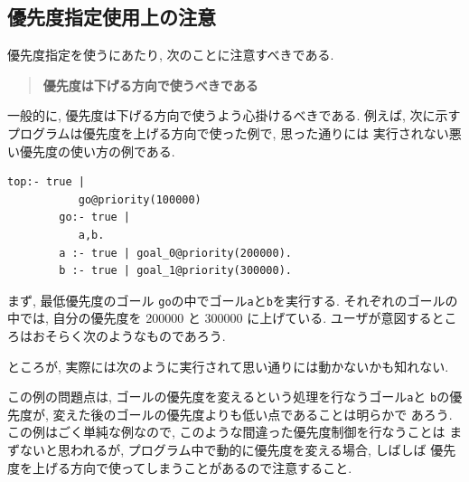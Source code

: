 \documentclass[a4,titlepage]{jsreport}
\let\dg\bf
\def\_{\leavevmode \kern.06em \vbox{\hrule width.3em}\penalty\exhyphenpenalty}
\begin{document}
\subsection{優先度指定使用上の注意}
優先度指定を使うにあたり, 次のことに注意すべきである.  

\begin{quote}
{\dg 優先度は下げる方向で使うべきである}
\end{quote}

一般的に, 優先度は下げる方向で使うよう心掛けるべきである. 例えば, 
次に示すプログラムは優先度を上げる方向で使った例で, 思った通りには
実行されない悪い優先度の使い方の例である. 


\begin{Verbatim}[baselinestretch=0.8]
        top:- true |
           go@priority(100000)
        go:- true |
           a,b.
        a :- true | goal_0@priority(200000).
        b :- true | goal_1@priority(300000).
\end{Verbatim}

まず, 最低優先度のゴール
{\tt go}の中でゴール{\tt a}と{\tt b}を実行する. それぞれのゴールの
中では, 自分の優先度を 200000 と 300000 に上げている. 
ユーザが意図するところはおそらく次のようなものであろう.


ところが, 実際には次のように実行されて思い通りには動かないかも知れない.


この例の問題点は, ゴールの優先度を変えるという処理を行なうゴール{\tt a}と
{\tt b}の優先度が, 変えた後のゴールの優先度よりも低い点であることは明らかで
あろう. この例はごく単純な例なので, このような間違った優先度制御を行なうことは
まずないと思われるが, プログラム中で動的に優先度を変える場合, しばしば
優先度を上げる方向で使ってしまうことがあるので注意すること.
\end{document}
